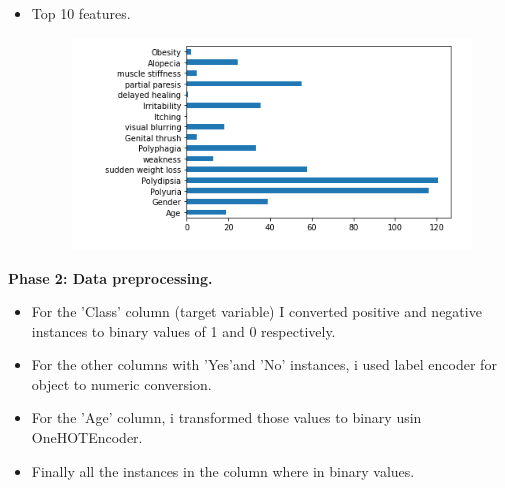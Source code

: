 \documentclass[11pt]{article}
\begin{document}
\begin{itemize}
\newpage 
	
		\item Top 10 features.\\
		
			\begin{figure}[h]
				\centerline{\small 
					\includegraphics[height=0.3\textheight]  {top}}
			\end{figure}
		
	
		
	\end{itemize}

\textbf{Phase 2: Data preprocessing.}
\begin{itemize}
	\item For the 'Class' column (target variable) I converted positive and negative instances to binary values of 1 and 0 respectively.\\
	\item For the other columns with 'Yes'and 'No' instances, i used label encoder for object to numeric conversion.\\
	\item For the 'Age' column, i transformed those values to binary usin OneHOTEncoder.\\
	\item Finally all the instances in the column where in binary values.\\
	
	
\end{itemize}
\end{document}

